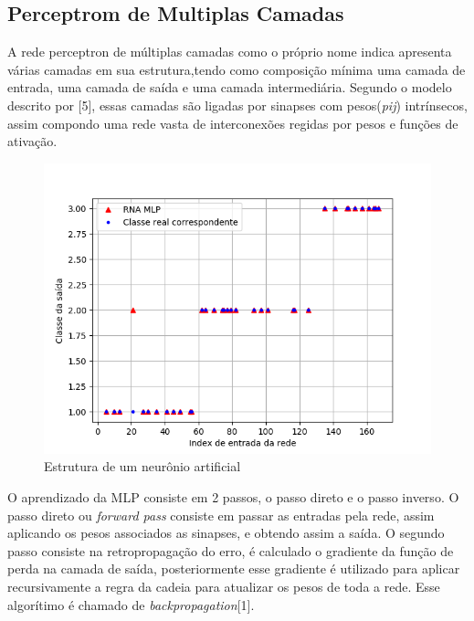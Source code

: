 \subsection{Perceptrom de Multiplas Camadas}

A rede perceptron de múltiplas camadas como o próprio nome indica apresenta várias camadas em sua estrutura,tendo como composição mínima uma camada de entrada, uma camada de saída e uma camada intermediária. Segundo o modelo descrito por [5], essas camadas são ligadas por sinapses com pesos(\textit{pij}) intrínsecos, assim compondo uma rede vasta de interconexões regidas por pesos e funções de ativação.
\begin{figure}[H]

\centering %
\includegraphics[width=\columnwidth]{04-Figuras/MLP}
\caption{Estrutura de um neurônio artificial}

\label{figura:Arquitetura de uma rede MLP}

\end{figure}

O aprendizado da MLP consiste em 2 passos, o passo direto e o passo inverso. O passo direto ou \textit{forward pass} consiste em passar as entradas pela rede, assim aplicando os pesos associados as sinapses, e obtendo assim a saída. O segundo passo consiste na retropropagação do erro, é calculado o gradiente da função de perda na camada de saída, posteriormente esse gradiente é utilizado para aplicar recursivamente a regra da cadeia para atualizar os pesos de toda a rede.
Esse algorítimo é chamado de \textit{backpropagation}[1].

